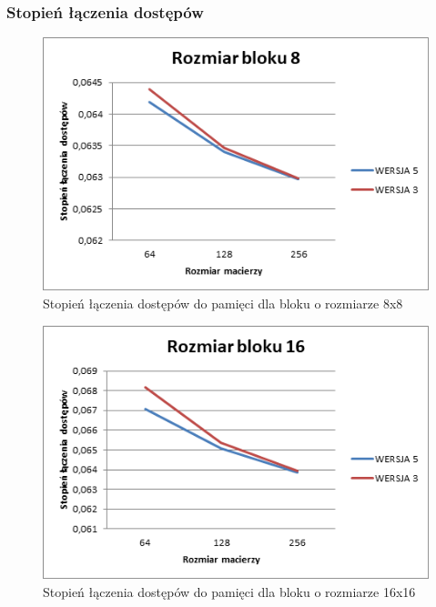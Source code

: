 \documentclass{article}
\begin{document}
\subsubsection{Stopień łączenia dostępów}

\begin{figure}[H]
	\centering
	\includegraphics[width=\linewidth]{./images/graphs/dostepy/graph1.png}
	\caption{Stopień łączenia dostępów do pamięci dla bloku o rozmiarze 8x8}
	\label{fig:graphd1}
\end{figure}

\begin{figure}[H]
	\centering
	\includegraphics[width=\linewidth]{./images/graphs/dostepy/graph2.png}
	\caption{Stopień łączenia dostępów do pamięci dla bloku o rozmiarze 16x16}
	\label{fig:graphd2}
\end{figure}
\end{document}

